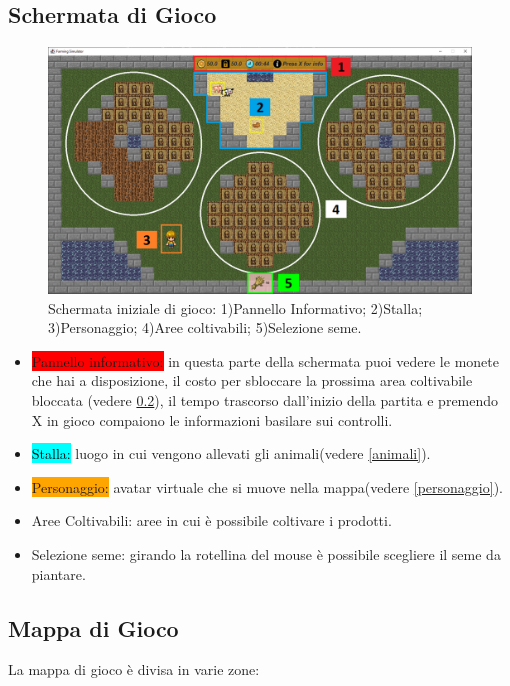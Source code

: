 \documentclass[a4paper,12pt]{report}
\begin{document}
\subsection{Schermata di Gioco}
\begin{figure}[!htb]
	\centerline{\includegraphics[width=\textwidth]{img/SchermataPrincipale.png}}
	\caption{Schermata iniziale di gioco: 1)Pannello Informativo; 2)Stalla; 3)Personaggio; 4)Aree coltivabili; 5)Selezione seme. }
	\label{img:schermata}
\end{figure}
\begin{itemize}
	\item[1)] \colorbox{red}{Pannello informativo:} in questa parte della schermata puoi vedere le monete che hai a disposizione, il costo per sbloccare la prossima area coltivabile bloccata (vedere \cref{mappa}), il tempo trascorso dall'inizio della partita e premendo X in gioco compaiono le informazioni basilare sui controlli.
	\item[2)] \colorbox{cyan}{\textcolor{black}{Stalla:}} luogo in cui vengono allevati gli animali(vedere \cref{animali}).
	\item[3)] \colorbox{orange}{Personaggio:} avatar virtuale che si muove nella mappa(vedere \cref{personaggio}).
	\item[4)] Aree Coltivabili: aree in cui è possibile coltivare i prodotti.
	\item[5)] Selezione seme: girando la rotellina del mouse è possibile scegliere il seme da piantare.
\end{itemize}
\subsection{Mappa di Gioco}
		\label{mappa}
	
		{La mappa di gioco è divisa in varie zone:}\\
		
\end{document}
